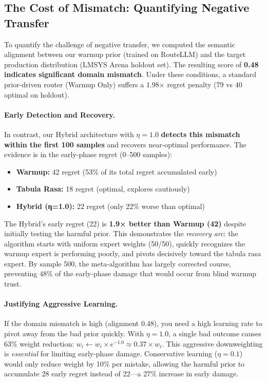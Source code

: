 \subsection{The Cost of Mismatch: Quantifying Negative Transfer}

To quantify the challenge of negative transfer, we computed the semantic alignment between our warmup prior (trained on RouteLLM) and the target production distribution (LMSYS Arena holdout set). The resulting score of \textbf{0.48 indicates significant domain mismatch}. Under these conditions, a standard prior-driven router (Warmup Only) suffers a 1.98× regret penalty (79 vs 40 optimal on holdout). 

\paragraph{Early Detection and Recovery.}
In contrast, our Hybrid architecture with $\eta=1.0$ \textbf{detects this mismatch within the first 100 samples} and recovers near-optimal performance. The evidence is in the early-phase regret (0--500 samples):

\begin{itemize}[leftmargin=*,nosep]
    \item \textbf{Warmup:} 42 regret (53\% of its total regret accumulated early)
    \item \textbf{Tabula Rasa:} 18 regret (optimal, explores cautiously)
    \item \textbf{Hybrid (η=1.0):} 22 regret (only 22\% worse than optimal)
\end{itemize}

The Hybrid's early regret (22) is \textbf{1.9× better than Warmup (42)} despite initially testing the harmful prior. This demonstrates the \emph{recovery arc}: the algorithm starts with uniform expert weights (50/50), quickly recognizes the warmup expert is performing poorly, and pivots decisively toward the tabula rasa expert. By sample 500, the meta-algorithm has largely corrected course, preventing 48\% of the early-phase damage that would occur from blind warmup trust.

\paragraph{Justifying Aggressive Learning.}
If the domain mismatch is high (alignment 0.48), you need a high learning rate to pivot away from the bad prior quickly. With $\eta=1.0$, a single bad outcome causes 63\% weight reduction: $w_i \leftarrow w_i \times e^{-1.0} \approx 0.37 \times w_i$. This aggressive downweighting is \emph{essential} for limiting early-phase damage. Conservative learning ($\eta=0.1$) would only reduce weight by 10\% per mistake, allowing the harmful prior to accumulate 28 early regret instead of 22—a 27\% increase in early damage.

